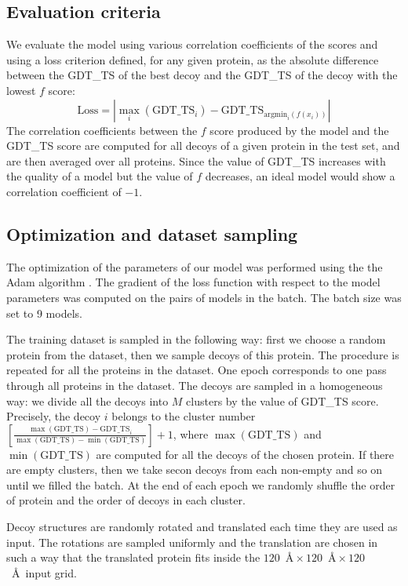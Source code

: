 \subsection{Evaluation criteria}
We evaluate the model using various correlation coefficients of the
scores and using a loss criterion defined, for any given protein, as
the absolute difference between the GDT\_TS of the best decoy and the
GDT\_TS of the decoy with the lowest $f$ score:
$$ 
\text{Loss} = \left| \max_i( \text{GDT\_TS}_i ) - \text{GDT\_TS}_{\mathrm{argmin}_i(f(x_i))} \right|
$$
%
The correlation coefficients between the $f$ score produced by the
model and the GDT\_TS score are computed for all decoys of a given
protein in the test set, and are then averaged over all
proteins. Since the value of GDT\_TS increases with the quality of a
model but the value of $f$ decreases, an ideal model would show a
correlation coefficient of $-1$.


\subsection{Optimization and dataset sampling}
The optimization of the parameters of our model was performed
using the the Adam algorithm \cite{kingma2014adam}. The gradient of the loss 
function with respect to the model parameters was computed on the pairs of 
models in the batch. The batch size was set to 9 models.


The training dataset is sampled in the following way: first we choose a
random protein from the dataset, then we sample decoys of this
protein.  The procedure is repeated for all the proteins in the
dataset. One epoch corresponds to one pass through all proteins in the
dataset.  The decoys are sampled in a homogeneous way: we divide all
the decoys into $M$ clusters by the value of GDT\_TS score.
Precisely, the decoy $i$ belongs to the cluster number $ \left[
  \frac{\max(\text{GDT\_TS}) - \text{GDT\_TS}_i}{\max(\text{GDT\_TS})
    - \min(\text{GDT\_TS})} \right] + 1$, where $\max(\text{GDT\_TS})$
and $\min(\text{GDT\_TS})$ are computed for all the decoys of the
chosen protein. If there are empty clusters, then we take secon decoys
from each non-empty and so on until we filled the batch.  At the end
of each epoch we randomly shuffle the order of protein and the order
of decoys in each cluster.

Decoy structures are randomly rotated and translated each time they
are used as input. The rotations are sampled uniformly
\cite{shoemake1992uniform} and the translation are chosen in such a
way that the translated protein fits inside the $120$~\AA${}\times
120$~\AA${}\times 120$~\AA\ input grid.

